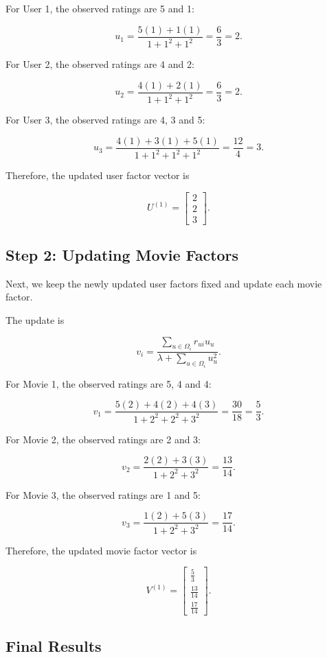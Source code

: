For User 1, the observed ratings are 5 and 1:

\[
u_1 =
\frac{5(1)+1(1)}{1+1^2+1^2}
=\frac{6}{3}=2.
\]

For User 2, the observed ratings are 4 and 2:

\[
u_2 =
\frac{4(1)+2(1)}{1+1^2+1^2}
=\frac{6}{3}=2.
\]

For User 3, the observed ratings are 4, 3 and 5:

\[
u_3 =
\frac{4(1)+3(1)+5(1)}{1+1^2+1^2+1^2}
=\frac{12}{4}=3.
\]

Therefore, the updated user factor vector is

\[
U^{(1)} =
\begin{bmatrix}
2\\
2\\
3
\end{bmatrix}.
\]

\subsection{Step 2: Updating Movie Factors}

Next, we keep the newly updated user factors fixed
and update each movie factor.

The update is

\[
v_i =
\frac{\displaystyle\sum_{u\in\Omega_i}r_{ui}u_u}
{\displaystyle\lambda+
\sum_{u\in\Omega_i}u_u^2}.
\]

For Movie 1, the observed ratings are 5, 4 and 4:

\[
v_1 =
\frac{5(2)+4(2)+4(3)}
{1+2^2+2^2+3^2}
=\frac{30}{18}=\frac{5}{3}.
\]

For Movie 2, the observed ratings are 2 and 3:

\[
v_2 =
\frac{2(2)+3(3)}
{1+2^2+3^2}
=\frac{13}{14}.
\]

For Movie 3, the observed ratings are 1 and 5:

\[
v_3 =
\frac{1(2)+5(3)}
{1+2^2+3^2}
=\frac{17}{14}.
\]

Therefore, the updated movie factor vector is

\[
V^{(1)} =
\begin{bmatrix}
\frac{5}{3}\\
\frac{13}{14}\\
\frac{17}{14}
\end{bmatrix}.
\]

\subsection{Final Results}

